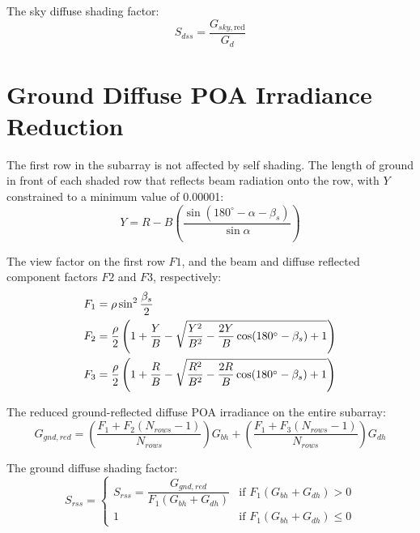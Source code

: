 \documentclass[12pt,letterpaper]{article}
\begin{document}
The sky diffuse shading factor:
\begin{equation}
S_{dss} = \frac{G_{sky,\text{red}}}{G_d}
\end{equation}

\section{Ground Diffuse POA Irradiance Reduction} \label{sec-selfshadgndred}


The first row in the subarray is not affected by self shading. The length of ground in front of each shaded row that reflects beam radiation onto the row, with $Y$ constrained to a minimum value of 0.00001:
\begin{equation}
Y = R - B \left(\frac{\sin( 180^\circ - \alpha - \beta_s )}{\sin\alpha} \right)
\end{equation}

The view factor on the first row $\mathit{F1}$, and the beam and diffuse reflected component factors $\mathit{F2}$ and $\mathit{F3}$, respectively:
\begin{align}
F_1 &= \mathit{\rho} \sin^2\frac{\beta_s}{2} \notag\\
F_2 &= \frac{\mathit{\rho}}{2} \left( 1 + \frac{Y}{B} - \sqrt{ \frac{Y^2}{B^2} - \frac{2Y}{B} \cos(180^\circ - \beta_s) + 1 }\right) \notag\\
F_3 &= \frac{\mathit{\rho}}{2} \left( 1 + \frac{R}{B} - \sqrt{ \frac{R^2}{B^2} - \frac{2R}{B} \cos(180^\circ - \beta_s) + 1 } \right)
\end{align}

The reduced ground-reflected diffuse POA irradiance on the entire subarray:
\begin{equation}
G_{gnd,red}=\left(\frac{F_1+F_2(N_{rows}-1)}{N_{rows}}\right)G_{bh}+\left(\frac{F_1+F_3(N_{rows}-1)}{N_{rows}}\right)G_{dh}
\end{equation}

The ground diffuse shading factor:
\[
S_{rss}=
 \left\{
     \begin{array}{ll}
      S_{rss} = \dfrac{G_{gnd,red}}{F_1 (G_{bh} +  G_{dh})}
      & \mbox{if $F_1 (G_{bh} + G_{dh}) > 0$}\\
      1 
      & \mbox{if $F_1 (G_{bh} + G_{dh}) \leq 0$}
    \end{array}
  \right.
\]
\end{document}
